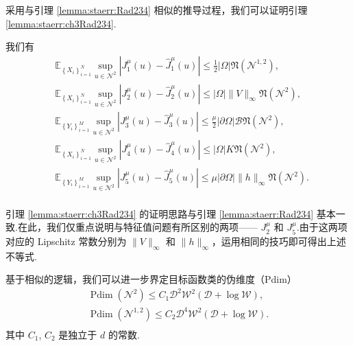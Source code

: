采用与引理 \ref{lemma:staerr:Rad234} 相似的推导过程，我们可以证明引理 \ref{lemma:staerr:ch3Rad234}.

\begin{lemma}\label{lemma:staerr:ch3Rad234}
我们有
\begin{equation}
\begin{aligned}
&\mathbb{E}_{\left\{X_{i}\right\}_{i=1}^{N}} \sup _{u \in \mathcal{N}^{2}}\left|J^{\mu}_{1}(u)-\widehat{J}^{\mu}_{1}(u)\right| \leq \frac{1}{2} |\Omega|\mathfrak{N}\left(\mathcal{N}^{1,2}\right),\\
&\mathbb{E}_{\left\{X_{i}\right\}_{i=1}^{N}} \sup _{u \in \mathcal{N}^{2}}\left|J^{\mu}_{2}(u)-\widehat{J}^{\mu}_{2}(u)\right| \leq |\Omega|\|V\|_{\infty}\mathfrak{N}\left(\mathcal{N}^{2}\right),\\
&\mathbb{E}_{\left\{Y_{i}\right\}_{i=1}^{M}} \sup _{u \in \mathcal{N}^{2}}\left|J^{\mu}_{3}(u)-\widehat{J}^{\mu}_{3}(u)\right| \leq \frac{\mu}{2}|\partial\Omega| \mathcal{B} \mathfrak{N}\left(\mathcal{N}^{2}\right),\\
&\mathbb{E}_{\left\{X_{i}\right\}_{i=1}^{N}} \sup _{u \in \mathcal{N}^{2}}\left|J^{\mu}_{4}(u)-\widehat{J}^{\mu}_{4}(u)\right| \leq |\Omega|K \mathfrak{N}\left(\mathcal{N}^{2}\right),\\
&\mathbb{E}_{\left\{Y_{i}\right\}_{i=1}^{M}} \sup _{u \in \mathcal{N}^{2}}\left|J^{\mu}_{5}(u)-\widehat{J}^{\mu}_{5}(u)\right| \leq \mu|\partial\Omega|\|h\|_{\infty} \mathfrak{N}\left(\mathcal{N}^{2}\right).\\
\end{aligned}
\end{equation}
\end{lemma}

引理 \ref{lemma:staerr:ch3Rad234} 的证明思路与引理 \ref{lemma:staerr:Rad234} 基本一致.在此，我们仅重点说明与特征值问题有所区别的两项—— $J_{2}^{\mu}$ 和 $J_{5}^{\mu}$.由于这两项对应的 Lipschitz 常数分别为 $\|V\|_{\infty}$ 和 $\|h\|_{\infty}$，运用相同的技巧即可得出上述不等式.

基于相似的逻辑，我们可以进一步界定目标函数类的伪维度（Pdim）
\begin{equation}\label{eq:ch3pdim}
\begin{aligned}
\operatorname{Pdim}(\mathcal{N}^{2})\leq C_{1} \mathcal{D}^2\mathcal{W}^2(\mathcal{D}+\log\mathcal{W}),\\
\operatorname{Pdim}(\mathcal{N}^{1,2})\leq C_{2} \mathcal{D}^4\mathcal{W}^2(\mathcal{D}+\log\mathcal{W}).\\
\end{aligned}
\end{equation}
其中 $C_1$, $C_2$ 是独立于 $d$ 的常数.

